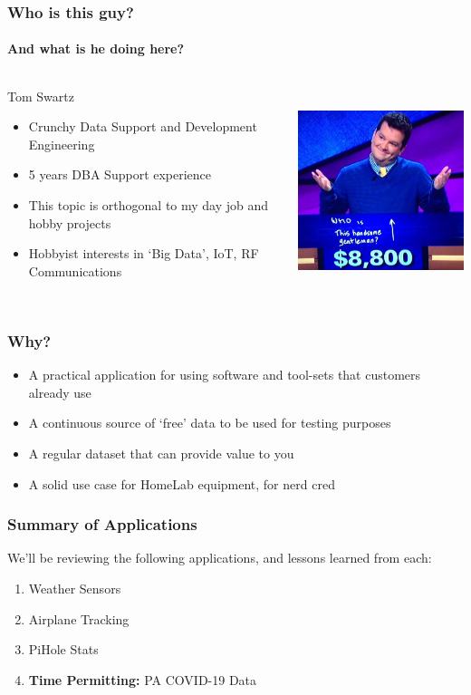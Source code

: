 \documentclass[aspectratio=169]{beamer}
\begin{document}
\begin{frame}
  \frametitle{Who is this guy?}
  \framesubtitle{And what is he doing here?}
  \begin{columns}[T]
    \begin{column}[T]{0.45\paperwidth}
      {\huge Tom Swartz}
      \vfill
      \begin{itemize}%
        \item{Crunchy Data Support and Development Engineering}
        \item{5 years DBA Support experience}
        \item{This topic is orthogonal to my day job and hobby projects}
        \item{Hobbyist interests in `Big Data', IoT, RF Communications}
      \end{itemize}
    \end{column}
    \begin{column}[T]{0.45\paperwidth}
      \includegraphics[height=6cm]{images/who-dat.jpg}
    \end{column}
  \end{columns}
\end{frame}

\begin{frame}[fragile]
  \frametitle{Why?}
  \begin{itemize}%
    \item{A practical application for using software and tool-sets that customers already use}
    \item{A continuous source of `free' data to be used for testing purposes}
    \item{A regular dataset that can provide value to you}
    \item{A solid use case for HomeLab equipment, for nerd cred}
 \end{itemize}
\end{frame}

\begin{frame}
  \frametitle{Summary of Applications}
  We'll be reviewing the following applications, and lessons learned from each:
  \begin{enumerate}
    \item{Weather Sensors}
    \item{Airplane Tracking}
    \item{PiHole Stats}
    \item\textbf{Time Permitting: }{PA COVID-19 Data}
  \end{enumerate}
\end{frame}
\end{document}
